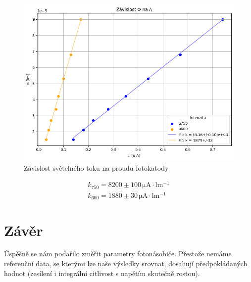 \documentclass[czech,11pt,a4paper]{article}
\begin{document}
\begin{multicols}{2}
		\begin{figure}[H]
			\centering
			\includegraphics[width=0.9\linewidth]{fig4}
			\caption{Závislost světelného toku na proudu fotokatody}
			
		\end{figure}
		\begin{gather*}
			k_{750} = 8200 \pm 100 \,\mathrm{\mu A \cdot lm ^{-1}}\\
			k_{600} = 1880 \pm 30 \,\mathrm{\mu A \cdot lm ^{-1}}
		\end{gather*}
		
		
		
		
		\section{Závěr}
		Úspěšně se nám podařilo změřit parametry fotonásobiče. Přestože nemáme referenční data, se kterými lze naše výsledky srovnat, dosahují předpokládaných hodnot (zesílení i integrální citlivost s napětím skutečně rostou). 
	\end{multicols}
\printbibliography
			
		
		
\end{document}
